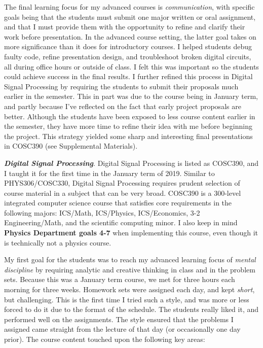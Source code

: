 \documentclass[../../../main.tex]{subfiles}
\begin{document}
The final learning focus for my advanced courses is \textit{communication}, with specific goals being that the students must submit one major written or oral assignment, and that I must provide them with the opportunity to refine and clarify their work before presentation.  In the advanced course setting, the latter goal takes on more significance than it does for introductory courses.  I helped students debug faulty code, refine presentation design, and troubleshoot broken digital circuits, all during office hours or outside of class.  I felt this was important so the students could achieve success in the final results.  I further refined this process in Digital Signal Processing by requiring the students to submit their proposals much earlier in the semester.  This in part was due to the course being in January term, and partly because I've reflected on the fact that early project proposals are better.  Although the students have been exposed to less course content earlier in the semester, they have more time to refine their idea with me before beginning the project.  This strategy yielded some sharp and interesting final presentations in COSC390 (see Supplemental Materials).  \\ \hspace{0.1cm}

\textbf{\textit{Digital Signal Processing}}.  Digital Signal Processing is listed as COSC390, and I taught it for the first time in the January term of 2019.  Similar to PHYS306/COSC330, Digital Signal Processing requires prudent selection of course material in a subject that can be very broad.  COSC390 is a 300-level integrated computer science course that satisfies core requirements in the following majors: ICS/Math, ICS/Physics, ICS/Economics, 3-2 Engineering/Math, and the scientific computing minor.  I also keep in mind \textbf{Physics Department goals 4-7} when implementing this course, even though it is technically not a physics course.  \\ \hspace{0.1cm}

My first goal for the students was to reach my advanced learning focus of \textit{mental discipline} by requiring analytic and creative thinking in class and in the problem sets.  Because this was a January term course, we met for three hours each morning for three weeks.  Homework sets were assigned each day, and kept \textit{short}, but challenging.  This is the first time I tried such a style, and was more or less forced to do it due to the format of the schedule.  The students really liked it, and performed well on the assignments.  The style ensured that the problems I assigned came straight from the lecture of that day (or occasionally one day prior).  The course content touched upon the following key areas:
\end{document}
